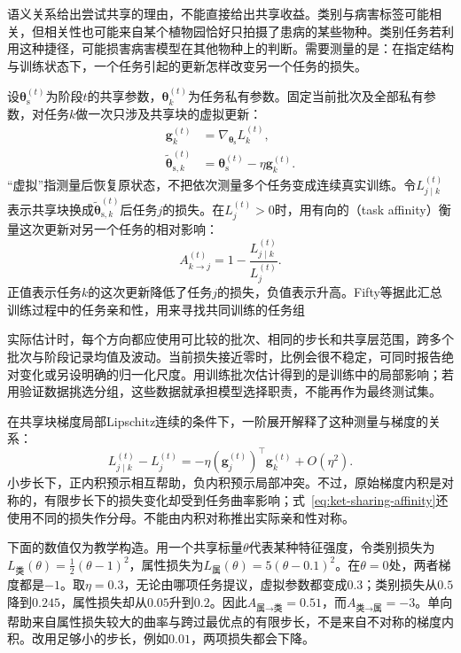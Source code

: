 语义关系给出尝试共享的理由，不能直接给出共享收益。类别与病害标签可能相关，但相关性也可能来自某个植物园恰好只拍摄了患病的某些物种。类别任务若利用这种捷径，可能损害病害模型在其他物种上的判断。需要测量的是：在指定结构与训练状态下，一个任务引起的更新怎样改变另一个任务的损失。

设$\bm{\theta}_{\mathrm{s}}^{(t)}$为阶段$t$的共享参数，$\bm{\theta}_k^{(t)}$为任务私有参数。固定当前批次及全部私有参数，对任务$k$做一次只涉及共享块的虚拟更新：
\begin{align}
  \bm g_k^{(t)}
    &=\nabla_{\bm{\theta}_{\mathrm{s}}}L_k^{(t)},
  \\
  \widetilde{\bm{\theta}}_{\mathrm{s},k}^{(t)}
    &=\bm{\theta}_{\mathrm{s}}^{(t)}-\eta\bm g_k^{(t)}.
  \label{eq:ket-sharing-virtual-step}
\end{align}
“虚拟”指测量后恢复原状态，不把依次测量多个任务变成连续真实训练。令$L_{j\mid k}^{(t)}$表示共享块换成$\widetilde{\bm{\theta}}_{\mathrm{s},k}^{(t)}$后任务$j$的损失。在$L_j^{(t)}>0$时，用有向的（task affinity）衡量这次更新对另一个任务的相对影响：
\begin{equation}
  A_{k\to j}^{(t)}
  =1-\frac{L_{j\mid k}^{(t)}}{L_j^{(t)}}.
  \label{eq:ket-sharing-affinity}
\end{equation}
正值表示任务$k$的这次更新降低了任务$j$的损失，负值表示升高。Fifty等据此汇总训练过程中的任务亲和性，用来寻找共同训练的任务组

实际估计时，每个方向都应使用可比较的批次、相同的步长和共享层范围，跨多个批次与阶段记录均值及波动。当前损失接近零时，比例会很不稳定，可同时报告绝对变化或另设明确的归一化尺度。用训练批次估计得到的是训练中的局部影响；若用验证数据挑选分组，这些数据就承担模型选择职责，不能再作为最终测试集。

在共享块梯度局部Lipschitz连续的条件下，一阶展开解释了这种测量与梯度的关系：
\begin{equation}
  L_{j\mid k}^{(t)}-L_j^{(t)}
  =-\eta(\bm g_j^{(t)})^{\top}\bm g_k^{(t)}
  +O(\eta^2).
  \label{eq:ket-sharing-local-effect}
\end{equation}
小步长下，正内积预示相互帮助，负内积预示局部冲突。不过，原始梯度内积是对称的，有限步长下的损失变化却受到任务曲率影响；式~\eqref{eq:ket-sharing-affinity}还使用不同的损失作分母。不能由内积对称推出实际亲和性对称。

下面的数值仅为教学构造。用一个共享标量$\theta$代表某种特征强度，令类别损失为$L_{\text{类}}(\theta)=\tfrac12(\theta-1)^2$，属性损失为$L_{\text{属}}(\theta)=5(\theta-0.1)^2$。在$\theta=0$处，两者梯度都是$-1$。取$\eta=0.3$，无论由哪项任务提议，虚拟参数都变成$0.3$；类别损失从$0.5$降到$0.245$，属性损失却从$0.05$升到$0.2$。因此$A_{\text{属}\to\text{类}}=0.51$，而$A_{\text{类}\to\text{属}}=-3$。单向帮助来自属性损失较大的曲率与跨过最优点的有限步长，不是来自不对称的梯度内积。改用足够小的步长，例如$0.01$，两项损失都会下降。

